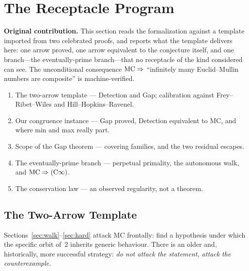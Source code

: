 \section{The Receptacle Program}
\label{sec:receptacle}

\noindent\textbf{Original contribution.}\enspace
This section reads the formalization against a template imported from
two celebrated proofs, and reports what the template delivers here:
one arrow proved, one arrow equivalent to the conjecture itself, and
one branch---the eventually-prime branch---that no receptacle of the
kind considered can see.  The unconditional consequence
$\mathrm{MC} \Rightarrow$ ``infinitely many Euclid--Mullin numbers are
composite'' is machine-verified.

\begin{roadmap}
\begin{enumerate}[nosep,leftmargin=*]
\item[\S\ref{sec:two-arrow}] The two-arrow template --- Detection and Gap;
  calibration against Frey--Ribet--Wiles and Hill--Hopkins--Ravenel.
\item[\S\ref{sec:congruence-receptacle}] Our congruence instance ---
  Gap proved, Detection equivalent to MC, and where min and max really part.
\item[\S\ref{sec:gap-scope}] Scope of the Gap theorem --- covering families,
  and the two residual escapes.
\item[\S\ref{sec:autonomous-branch}] The eventually-prime branch ---
  perpetual primality, the autonomous walk, and $\mathrm{MC} \Rightarrow (\mathrm{C}\infty)$.
\item[\S\ref{sec:conservation}] The conservation law --- an observed regularity,
  not a theorem.
\end{enumerate}
\end{roadmap}

\subsection{The Two-Arrow Template}
\label{sec:two-arrow}

Sections~\ref{sec:walk}--\ref{sec:hard} attack MC frontally: find a
hypothesis under which the specific orbit of~$2$ inherits generic
behaviour.  There is an older and, historically, more successful
strategy: \emph{do not attack the statement, attack the
counterexample.}


